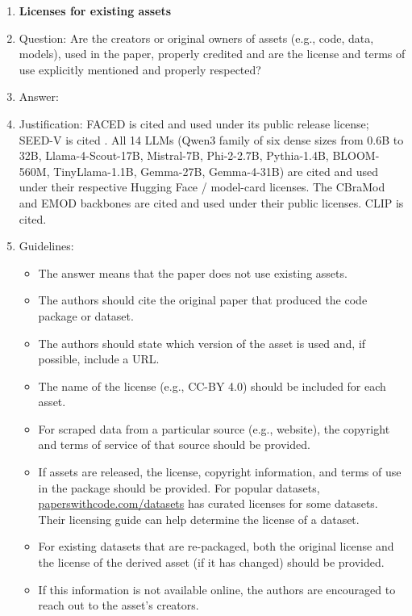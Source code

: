 \begin{enumerate}
\item {\bf Licenses for existing assets}
    \item[] Question: Are the creators or original owners of assets (e.g., code, data, models), used in the paper, properly credited and are the license and terms of use explicitly mentioned and properly respected?
    \item[] Answer: \answerYes{}
    \item[] Justification: FACED is cited \citep{chen2023faced} and used under its public release license; SEED-V is cited \citep{liu2022seedv}. All 14 LLMs (Qwen3 family of six dense sizes from 0.6B to 32B, Llama-4-Scout-17B, Mistral-7B, Phi-2-2.7B, Pythia-1.4B, BLOOM-560M, TinyLlama-1.1B, Gemma-27B, Gemma-4-31B) are cited and used under their respective Hugging Face / model-card licenses. The CBraMod \citep{wang2025cbramod} and EMOD \citep{chen2025emod} backbones are cited and used under their public licenses. CLIP \citep{radford2021clip} is cited.
    \item[] Guidelines:
    \begin{itemize}
        \item The answer \answerNA{} means that the paper does not use existing assets.
        \item The authors should cite the original paper that produced the code package or dataset.
        \item The authors should state which version of the asset is used and, if possible, include a URL.
        \item The name of the license (e.g., CC-BY 4.0) should be included for each asset.
        \item For scraped data from a particular source (e.g., website), the copyright and terms of service of that source should be provided.
        \item If assets are released, the license, copyright information, and terms of use in the package should be provided. For popular datasets, \url{paperswithcode.com/datasets} has curated licenses for some datasets. Their licensing guide can help determine the license of a dataset.
        \item For existing datasets that are re-packaged, both the original license and the license of the derived asset (if it has changed) should be provided.
        \item If this information is not available online, the authors are encouraged to reach out to the asset's creators.
    \end{itemize}


\end{enumerate}
